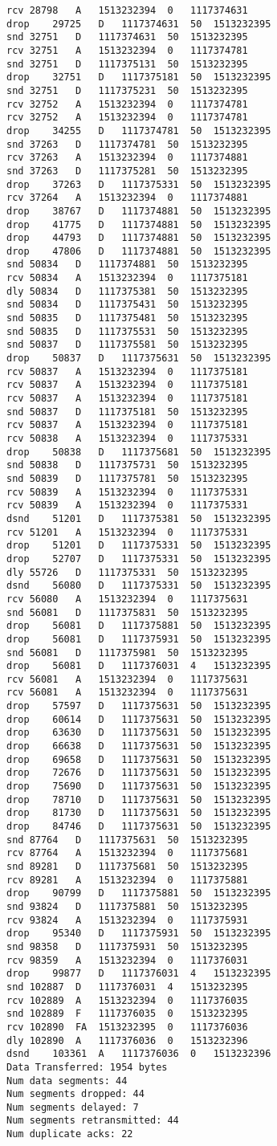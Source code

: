 \documentclass[a4paper]{article}
\begin{document}
\begin{lstlisting}
rcv	28798	A	1513232394	0	1117374631
drop	29725	D	1117374631	50	1513232395
snd	32751	D	1117374631	50	1513232395
rcv	32751	A	1513232394	0	1117374781
snd	32751	D	1117375131	50	1513232395
drop	32751	D	1117375181	50	1513232395
snd	32751	D	1117375231	50	1513232395
rcv	32752	A	1513232394	0	1117374781
rcv	32752	A	1513232394	0	1117374781
drop	34255	D	1117374781	50	1513232395
snd	37263	D	1117374781	50	1513232395
rcv	37263	A	1513232394	0	1117374881
snd	37263	D	1117375281	50	1513232395
drop	37263	D	1117375331	50	1513232395
rcv	37264	A	1513232394	0	1117374881
drop	38767	D	1117374881	50	1513232395
drop	41775	D	1117374881	50	1513232395
drop	44793	D	1117374881	50	1513232395
drop	47806	D	1117374881	50	1513232395
snd	50834	D	1117374881	50	1513232395
rcv	50834	A	1513232394	0	1117375181
dly	50834	D	1117375381	50	1513232395
snd	50834	D	1117375431	50	1513232395
snd	50835	D	1117375481	50	1513232395
snd	50835	D	1117375531	50	1513232395
snd	50837	D	1117375581	50	1513232395
drop	50837	D	1117375631	50	1513232395
rcv	50837	A	1513232394	0	1117375181
rcv	50837	A	1513232394	0	1117375181
rcv	50837	A	1513232394	0	1117375181
snd	50837	D	1117375181	50	1513232395
rcv	50837	A	1513232394	0	1117375181
rcv	50838	A	1513232394	0	1117375331
drop	50838	D	1117375681	50	1513232395
snd	50838	D	1117375731	50	1513232395
snd	50839	D	1117375781	50	1513232395
rcv	50839	A	1513232394	0	1117375331
rcv	50839	A	1513232394	0	1117375331
dsnd	51201	D	1117375381	50	1513232395
rcv	51201	A	1513232394	0	1117375331
drop	51201	D	1117375331	50	1513232395
drop	52707	D	1117375331	50	1513232395
dly	55726	D	1117375331	50	1513232395
dsnd	56080	D	1117375331	50	1513232395
rcv	56080	A	1513232394	0	1117375631
snd	56081	D	1117375831	50	1513232395
drop	56081	D	1117375881	50	1513232395
drop	56081	D	1117375931	50	1513232395
snd	56081	D	1117375981	50	1513232395
drop	56081	D	1117376031	4	1513232395
rcv	56081	A	1513232394	0	1117375631
rcv	56081	A	1513232394	0	1117375631
drop	57597	D	1117375631	50	1513232395
drop	60614	D	1117375631	50	1513232395
drop	63630	D	1117375631	50	1513232395
drop	66638	D	1117375631	50	1513232395
drop	69658	D	1117375631	50	1513232395
drop	72676	D	1117375631	50	1513232395
drop	75690	D	1117375631	50	1513232395
drop	78710	D	1117375631	50	1513232395
drop	81730	D	1117375631	50	1513232395
drop	84746	D	1117375631	50	1513232395
snd	87764	D	1117375631	50	1513232395
rcv	87764	A	1513232394	0	1117375681
snd	89281	D	1117375681	50	1513232395
rcv	89281	A	1513232394	0	1117375881
drop	90799	D	1117375881	50	1513232395
snd	93824	D	1117375881	50	1513232395
rcv	93824	A	1513232394	0	1117375931
drop	95340	D	1117375931	50	1513232395
snd	98358	D	1117375931	50	1513232395
rcv	98359	A	1513232394	0	1117376031
drop	99877	D	1117376031	4	1513232395
snd	102887	D	1117376031	4	1513232395
rcv	102889	A	1513232394	0	1117376035
snd	102889	F	1117376035	0	1513232395
rcv	102890	FA	1513232395	0	1117376036
dly	102890	A	1117376036	0	1513232396
dsnd	103361	A	1117376036	0	1513232396
Data Transferred: 1954 bytes
Num data segments: 44
Num segments dropped: 44
Num segments delayed: 7
Num segments retransmitted: 44
Num duplicate acks: 22
\end{lstlisting}
\end{document}
